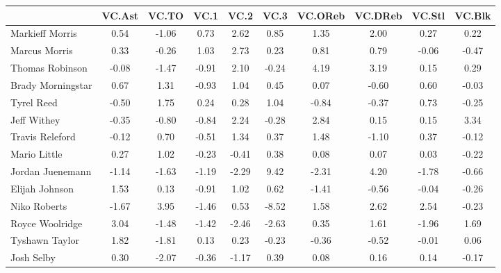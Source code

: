 \documentclass[10pt,letterpaper]{article}
\begin{document}
\begin{table}[ht]
\begin{center}
\begin{tabular}{lccccccccc}
  \hline
 & VC.Ast & VC.TO & VC.1 & VC.2 & VC.3 & VC.OReb & VC.DReb & VC.Stl & VC.Blk \\ 
  \hline
Markieff Morris & 0.54 & -1.06 & 0.73 & 2.62 & 0.85 & 1.35 & 2.00 & 0.27 & 0.22 \\ 
  Marcus Morris & 0.33 & -0.26 & 1.03 & 2.73 & 0.23 & 0.81 & 0.79 & -0.06 & -0.47 \\ 
  Thomas Robinson & -0.08 & -1.47 & -0.91 & 2.10 & -0.24 & 4.19 & 3.19 & 0.15 & 0.29 \\ 
  Brady Morningstar & 0.67 & 1.31 & -0.93 & 1.04 & 0.45 & 0.07 & -0.60 & 0.60 & -0.03 \\ 
  Tyrel Reed & -0.50 & 1.75 & 0.24 & 0.28 & 1.04 & -0.84 & -0.37 & 0.73 & -0.25 \\ 
  Jeff Withey & -0.35 & -0.80 & -0.84 & 2.24 & -0.28 & 2.84 & 0.15 & 0.15 & 3.34 \\ 
  Travis Releford & -0.12 & 0.70 & -0.51 & 1.34 & 0.37 & 1.48 & -1.10 & 0.37 & -0.12 \\ 
  Mario Little & 0.27 & 1.02 & -0.23 & -0.41 & 0.38 & 0.08 & 0.07 & 0.03 & -0.22 \\ 
  Jordan Juenemann & -1.14 & -1.63 & -1.19 & -2.29 & 9.42 & -2.31 & 4.20 & -1.78 & -0.66 \\ 
  Elijah Johnson & 1.53 & 0.13 & -0.91 & 1.02 & 0.62 & -1.41 & -0.56 & -0.04 & -0.26 \\ 
  Niko Roberts & -1.67 & 3.95 & -1.46 & 0.53 & -8.52 & 1.58 & 2.62 & 2.54 & -0.23 \\ 
  Royce Woolridge & 3.04 & -1.48 & -1.42 & -2.46 & -2.63 & 0.35 & 1.61 & -1.96 & 1.69 \\ 
  Tyshawn Taylor & 1.82 & -1.81 & 0.13 & 0.23 & -0.23 & -0.36 & -0.52 & -0.01 & 0.06 \\ 
  Josh Selby & 0.30 & -2.07 & -0.36 & -1.17 & 0.39 & 0.08 & 0.16 & 0.14 & -0.17 \\ 
   \hline
\end{tabular}
\end{center}
\end{table}
\end{document}
